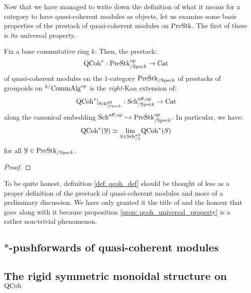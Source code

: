             Now that we have managed to write down the definition of what it means for a category to have quasi-coherent modules as objects, let us examine some basic properties of the prestack of quasi-coherent modules on $\mathrm{Pre}\mathrm{Stk}$. The first of these is its universal property.
            \begin{proposition} \label{prop: qcoh_universal_property}
                Fix a base commutative ring $k$. Then, the prestack:
                    $$\mathrm{QCoh}^*: \mathrm{Pre}\mathrm{Stk}_{/\mathrm{Spec} k}^{\mathrm{op}} \to \mathrm{Cat}$$
                of quasi-coherent modules on the $1$-category $\mathrm{Pre}\mathrm{Stk}_{/\mathrm{Spec} k}$ of prestacks of groupoids on ${}^{k/}\mathrm{Comm}\mathrm{Alg}^{\mathrm{op}}$ is the \textit{right}-Kan extension of:
                    $$\mathrm{QCoh}^*|_{\mathrm{Sch}^{\mathrm{aff}}_{/\mathrm{Spec} k}}: \mathrm{Sch}^{\mathrm{aff}, \mathrm{op}}_{/\mathrm{Spec} k} \to \mathrm{Cat}$$
                along the canonical embedding $\mathrm{Sch}^{\mathrm{aff}, \mathrm{op}} \hookrightarrow \mathrm{Pre}\mathrm{Stk}_{/\mathrm{Spec} k}^{\mathrm{op}}$. In particular, we have:
                    $$\mathrm{QCoh}^*(\mathcal{Y}) \simeq \underset{S \in \mathrm{Sch}^{\mathrm{aff}}_{/\mathcal{Y}}}{\operatorname{lim}} \mathrm{QCoh}^*(S)$$
                for all $\mathcal{Y} \in \mathrm{Pre}\mathrm{Stk}_{/\mathrm{Spec} k}$.
            \end{proposition}
                \begin{proof}
                    
                \end{proof}
            \begin{remark}
                To be quite honest, definition \ref{def: qcoh_def} should be thought of less as a proper definition of the prestack of quasi-coherent modules and more of a preliminary discussion. We have only granted it the title of  and the honour that goes along with it because proposition \ref{prop: qcoh_universal_property} is a rather non-trivial phenomenon. 
            \end{remark}
            
        \subsection{\texorpdfstring{$*$}{}-pushforwards of quasi-coherent modules} \label{subsubsection: qcoh_*_pushforwards}
                    
        \subsection{The rigid symmetric monoidal structure on \texorpdfstring{$\mathrm{QCoh}$}{}}
        
